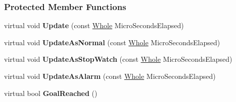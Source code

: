 \subsubsection*{Protected Member Functions}
\begin{DoxyCompactItemize}
\item 
\hypertarget{classphys_1_1SimpleTimer_a4fa114aae9cf0418edd8a80f307f3906}{
virtual void {\bfseries Update} (const \hyperlink{namespacephys_a460f6bc24c8dd347b05e0366ae34f34a}{Whole} MicroSecondsElapsed)}
\label{d0/d15/classphys_1_1SimpleTimer_a4fa114aae9cf0418edd8a80f307f3906}

\item 
\hypertarget{classphys_1_1SimpleTimer_ab7ff17f3515f07713b65df8887801f0d}{
virtual void {\bfseries UpdateAsNormal} (const \hyperlink{namespacephys_a460f6bc24c8dd347b05e0366ae34f34a}{Whole} MicroSecondsElapsed)}
\label{d0/d15/classphys_1_1SimpleTimer_ab7ff17f3515f07713b65df8887801f0d}

\item 
\hypertarget{classphys_1_1SimpleTimer_a5b9cdf890b478ab1f0bf8d0919df4157}{
virtual void {\bfseries UpdateAsStopWatch} (const \hyperlink{namespacephys_a460f6bc24c8dd347b05e0366ae34f34a}{Whole} MicroSecondsElapsed)}
\label{d0/d15/classphys_1_1SimpleTimer_a5b9cdf890b478ab1f0bf8d0919df4157}

\item 
\hypertarget{classphys_1_1SimpleTimer_a7fcd77c7b49f807cc9e43b3b521d2056}{
virtual void {\bfseries UpdateAsAlarm} (const \hyperlink{namespacephys_a460f6bc24c8dd347b05e0366ae34f34a}{Whole} MicroSecondsElapsed)}
\label{d0/d15/classphys_1_1SimpleTimer_a7fcd77c7b49f807cc9e43b3b521d2056}

\item 
\hypertarget{classphys_1_1SimpleTimer_a435c974da0511d6beafcefb9b987a21c}{
virtual bool {\bfseries GoalReached} ()}
\label{d0/d15/classphys_1_1SimpleTimer_a435c974da0511d6beafcefb9b987a21c}

\end{DoxyCompactItemize}
